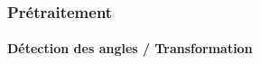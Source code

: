         \begin{frame}
            \frametitle{Prétraitement}
            \framesubtitle{Détection des angles / Transformation}
            \begin{columns}
                \begin{column}{.3\linewidth}
                \end{column}
                \pause
                \begin{column}{.3\linewidth}

\end{column}
\end{columns}
\end{frame}
